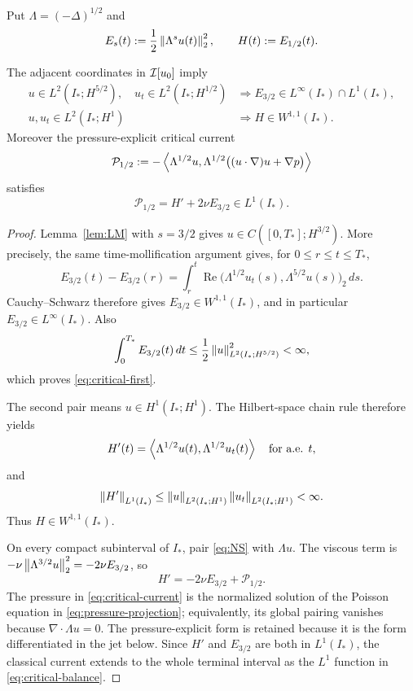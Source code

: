Put \(\Lambda=(-\Delta)^{1/2}\) and
\begin{equation}
 E_s(t):=\frac12\left\lVert \Lambda^s u(t)\right\rVert_2^2,
 \qquad H(t):=E_{1/2}(t).
 \label{eq:energies}
\end{equation}

\begin{proposition}
\label{prop:critical}
The adjacent coordinates in \(\mathcal I[u_0]\) imply
\begin{align}
 u\in L^2(I_*;H^{5/2}),\quad
 u_t\in L^2(I_*;H^{1/2})
 &\Longrightarrow
 E_{3/2}\in L^\infty(I_*)\cap L^1(I_*),
 \label{eq:critical-first}\\
 u,u_t\in L^2(I_*;H^1)
 &\Longrightarrow H\in W^{1,1}(I_*).
 \label{eq:critical-second}
\end{align}
Moreover the pressure-explicit critical current
\begin{equation}
 \mathcal P_{1/2}
 :=-\left\langle \Lambda^{1/2}u,\Lambda^{1/2}\bigl((u\cdot\nabla)u+\nabla p\bigr)\right\rangle
 \label{eq:critical-current}
\end{equation}
satisfies
\begin{equation}
 \mathcal P_{1/2}=H'+2\nu E_{3/2}\in L^1(I_*).
 \label{eq:critical-balance}
\end{equation}
\end{proposition}

\begin{proof}
Lemma~\ref{lem:LM} with \(s=3/2\) gives
\(u\in C([0,T_*];H^{3/2})\). More precisely, the same
time-mollification argument gives, for \(0\leq r\leq t\leq T_*\),
\begin{equation}
 E_{3/2}(t)-E_{3/2}(r)
 =\int_r^t\operatorname{Re}
 \bigl(\Lambda^{1/2}u_t(s),\Lambda^{5/2}u(s)\bigr)_2\,ds.
 \label{eq:critical-trace-identity}
\end{equation}
Cauchy--Schwarz therefore gives \(E_{3/2}\in W^{1,1}(I_*)\), and in
particular \(E_{3/2}\in L^\infty(I_*)\). Also
\[
 \int_0^{T_*}E_{3/2}(t)\,dt
 \leq\frac12\left\lVert u\right\rVert_{L^2(I_*;H^{5/2})}^2<\infty,
\]
which proves \eqref{eq:critical-first}.

The second pair means \(u\in H^1(I_*;H^1)\). The Hilbert-space chain rule
therefore yields
\begin{equation}
 H'(t)=\left\langle \Lambda^{1/2}u(t),\Lambda^{1/2}u_t(t)\right\rangle
 \quad\text{for a.e. }t,
 \label{eq:H-prime}
\end{equation}
and
\[
 \left\lVert H'\right\rVert_{L^1(I_*)}
 \leq\left\lVert u\right\rVert_{L^2(I_*;H^1)}
       \left\lVert u_t\right\rVert_{L^2(I_*;H^1)}<\infty.
\]
Thus \(H\in W^{1,1}(I_*)\).

On every compact subinterval of \(I_*\), pair \eqref{eq:NS} with
\(\Lambda u\). The viscous term is
\(-\nu\left\lVert \Lambda^{3/2}u\right\rVert_2^2=-2\nu E_{3/2}\), so
\[
 H'=-2\nu E_{3/2}+\mathcal P_{1/2}.
\]
The pressure in \eqref{eq:critical-current} is the normalized solution of the
Poisson equation in \eqref{eq:pressure-projection}; equivalently, its global
pairing vanishes because \(\nabla\cdot\Lambda u=0\). The pressure-explicit
form is retained because it is the form differentiated in the jet below.
Since \(H'\) and \(E_{3/2}\) are both in \(L^1(I_*)\), the classical current
extends to the whole terminal interval as the \(L^1\) function in
\eqref{eq:critical-balance}.
\end{proof}

